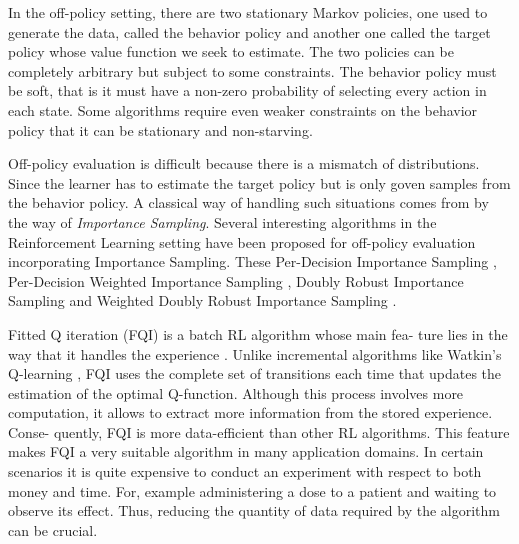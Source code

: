 In the off-policy setting, there are two stationary Markov policies, one used
to generate the data, called the behavior policy and another one called the target policy whose value function we seek to estimate. The two policies can be completely arbitrary but subject to some constraints. The behavior policy must be soft, that is it must
have a non-zero probability of selecting every action in
each state. Some algorithms require even weaker constraints on the behavior policy that it can be stationary and non-starving. 

Off-policy evaluation is difficult because there is a mismatch of distributions. Since the learner has to estimate the target policy but is only goven samples from the behavior policy. A classical way of handling such situations comes from \citet{DBLP:books/lib/Rubinstein81} by the way of \textit{Importance Sampling}. Several interesting algorithms in the Reinforcement Learning setting have been proposed for off-policy evaluation incorporating Importance Sampling. These Per-Decision Importance Sampling \citep{DBLP:conf/icml/PrecupSS00}, Per-Decision Weighted Importance Sampling \citep{DBLP:conf/icml/PrecupSS00}, Doubly Robust Importance \citep{DBLP:journals/corr/JiangL15} Sampling and Weighted Doubly Robust Importance Sampling \citep{DBLP:conf/icml/ThomasB16}. 

Fitted Q iteration (FQI) is a batch RL algorithm whose main fea-
ture lies in the way that it handles the experience \citep{DBLP:journals/jmlr/ErnstGW05}. Unlike incremental algorithms like Watkin's Q-learning \citep{DBLP:journals/ml/WatkinsD92}, FQI uses the complete set of transitions each time that updates the estimation of the optimal Q-function. Although this process involves more computation, it allows to extract more information from the stored experience. Conse-
quently, FQI is more data-efficient than other RL algorithms. This feature makes FQI a very suitable algorithm in many application domains. In certain scenarios it is quite expensive to conduct an experiment with respect to both money and time. For, example administering a dose to a patient and waiting to observe its effect. Thus, reducing the quantity of data required by the algorithm can be crucial.
